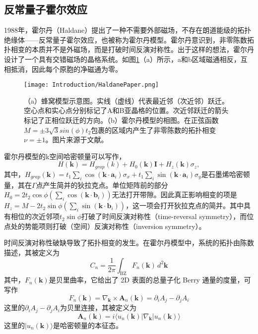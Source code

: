 \subsection{反常量子霍尔效应}
1988年，霍尔丹（Haldane）提出了一种不需要外部磁场，不存在朗道能级的拓扑绝缘体——反常量子霍尔效应\cite{haldane1988model}，也被称为霍尔丹模型。霍尔丹意识到，非零陈数拓扑相变的本质并不是外磁场，而是打破时间反演对称性。出于这样的想法，霍尔丹设计了一个具有交错磁场的晶格系统。如图\ref{fig:HaldanePaper}（a）所示，a和b区域磁通相反，互相抵消，因此每个原胞的净磁通为零。
\begin{figure}
    \centering
    \texttt{[image: Introduction/HaldanePaper.png]}
    \caption{（a）蜂窝模型示意图。实线（虚线）代表最近邻（次近邻）跃迁。空心点和实心点分别标记了A和B亚晶格的位置。次近邻跃迁的箭头标记了正相位跃迁的方向。（b）霍尔丹模型的相图。在正弦函数$M=\pm3\sqrt{3}sin(\phi)t_2$包裹的区域内产生了非零陈数的拓扑相变$\nu=\pm1$。图片来源于文献\cite{haldane1988model}。}
    \label{fig:HaldanePaper}
\end{figure}
霍尔丹模型的k空间哈密顿量可以写作，
\begin{equation}
H(\mathbf{k}) = H_{grap}(k) + H_0(\mathbf{k}) \mathbf{I} + H_z(\mathbf{k}) \sigma_z,
\end{equation}
其中，$H_{grap}(\mathbf{k}) = t_1 \sum_i \cos(\mathbf{k} \cdot \mathbf{a}_i) \sigma_x + t_1 \sum_i \sin(\mathbf{k} \cdot \mathbf{a}_i) \sigma_y$是石墨烯哈密顿量，其在$\Gamma$点产生简并的狄拉克点。单位矩阵前的部分$H_0 = 2t_2 \cos\phi \left( \sum_i \cos(\mathbf{k} \cdot \mathbf{b}_i) \right)$无法打开带隙。因此真正影响相变的项是$H_z = M - 2t_2 \sin\phi \left( \sum_i \sin(\mathbf{k} \cdot \mathbf{b}_i) \right)$，这一项会打开狄拉克点的简并。其中具有相位的次近邻项$t_2\sin\phi$打破了时间反演对称性（time-reversal symmetry），而位点处的势能项则打破（空间）反演对称性（inversion symmetry）。

时间反演对称性破缺导致了拓扑相变的发生。在霍尔丹模型中，系统的拓扑由陈数描述，其被定义为
\begin{equation}
    C_n = \frac{1}{2\pi} \int_{\text{BZ}} F_{n}(\mathbf{k}) \, d^2\mathbf{k}
\end{equation}
其中，$F_{n}(\mathbf{k})$是贝里曲率，它给出了 2D 表面的总量子化 Berry 通量的度量，可写作
\begin{equation}
    F_{n}(\mathbf{k}) = \nabla_{\mathbf{k}} \times \mathbf{A}_{n}(\mathbf{k})=\partial_{i} A_{j} - \partial_{j} A_{i}
\end{equation}
这里的$\partial_{i} A_{j} - \partial_{j} A_{i}$为贝里连接，其被定义为
\begin{equation}
    \mathbf{A}_{n}(\mathbf{k}) = i \langle u_{n}(\mathbf{k}) | \nabla_{\mathbf{k}} | u_{n}(\mathbf{k}) \rangle
\end{equation}
这里的$| u_{n}(\mathbf{k}) \rangle$是哈密顿量的本征态。


